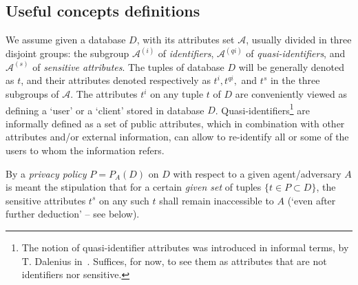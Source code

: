 \documentclass[pdflatex]{article}
\def \A {{\mathcal{A}}}
\begin{document}
\subsection{Useful concepts definitions}
We assume given a database $D$, with its attributes set $\A$, usually divided in 
three disjoint groups: the subgroup $\A^{(i)}$ of {\em identifiers}, $\A^{(qi)}$ of
{\em quasi-identifiers}, and  $\A^{(s)}$ of {\em sensitive attributes}. The tuples of
database $D$ will be generally  denoted as $t$, and their attributes
denoted respectively as $t^{i}, t^{qi},$ and $t^{s}$ in the three subgroups of $\A$.
The attributes $t^{i}$ on any tuple $t$ of $D$  are conveniently viewed  as defining  a
`user' or a `client' stored in database $D$.
Quasi-identifiers\footnote{The notion of quasi-identifier attributes was introduced in
informal terms, by T. Dalenius in~\cite{Quasi-Id}. Suffices, for now, to see them as
attributes that are not identifiers nor  sensitive.} are informally defined as a set of
public attributes, which  in combination with other attributes and/or external
information, can allow to re-identify all or some of the users to whom the information
refers. 

By a  {\em privacy  policy} $P = P_A(D)$ on $D$ with respect to a given
agent/adversary $A$ is meant the stipulation that for a certain {\em given set} of
tuples $\{t \in P \subset D\}$, the sensitive attributes $t^{s}$ on any such  $t$ shall 
remain inaccessible to $A$ (`even after further deduction' -- see below).
\end{document}
